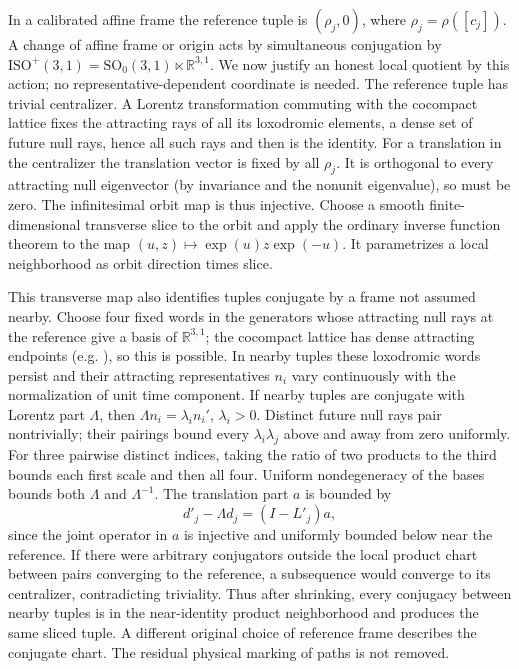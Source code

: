 \documentclass[11pt]{article}
\theoremstyle{remark}
\newcommand{\Mink}{\mathbb R^{3,1}}
\newcommand{\SO}{\mathrm{SO}_0(3,1)}
\newcommand{\ISO}{\mathrm{ISO}^{+}(3,1)}
\begin{document}
In a calibrated affine frame the reference tuple is \((\rho_j,0)\), where \(\rho_j=\rho([c_j])\). A change of affine frame or origin acts by simultaneous conjugation by \(\ISO=\SO\ltimes\Mink\). We now justify an honest local quotient by this action; no representative-dependent coordinate is needed. The reference tuple has trivial centralizer. A Lorentz transformation commuting with the cocompact lattice fixes the attracting rays of all its loxodromic elements, a dense set of future null rays, hence all such rays and then is the identity. For a translation in the centralizer the translation vector is fixed by all \(\rho_j\). It is orthogonal to every attracting null eigenvector (by invariance and the nonunit eigenvalue), so must be zero. The infinitesimal orbit map is thus injective. Choose a smooth finite-dimensional transverse slice to the orbit and apply the ordinary inverse function theorem to the map \((u,z)\mapsto\exp(u)z\exp(-u)\). It parametrizes a local neighborhood as orbit direction times slice.

This transverse map also identifies tuples conjugate by a frame not assumed nearby. Choose four fixed words in the generators whose attracting null rays at the reference give a basis of \(\Mink\); the cocompact lattice has dense attracting endpoints (e.g. \cite{Ratcliffe}), so this is possible. In nearby tuples these loxodromic words persist and their attracting representatives \(n_i\) vary continuously with the normalization of unit time component. If nearby tuples are conjugate with Lorentz part \(\Lambda\), then \(\Lambda n_i=\lambda_i n_i'\), \(\lambda_i>0\). Distinct future null rays pair nontrivially; their pairings bound every \(\lambda_i\lambda_j\) above and away from zero uniformly. For three pairwise distinct indices, taking the ratio of two products to the third bounds each first scale and then all four. Uniform nondegeneracy of the bases bounds both \(\Lambda\) and \(\Lambda^{-1}\). The translation part \(a\) is bounded by
\[
    d'_j-\Lambda d_j=(I-L'_j)a ,
\]
since the joint operator in \(a\) is injective and uniformly bounded below near the reference. If there were arbitrary conjugators outside the local product chart between pairs converging to the reference, a subsequence would converge to its centralizer, contradicting triviality. Thus after shrinking, every conjugacy between nearby tuples is in the near-identity product neighborhood and produces the same sliced tuple. A different original choice of reference frame describes the conjugate chart. The residual physical marking of paths is not removed.
\end{document}
